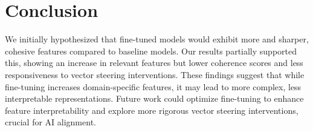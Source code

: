 \section{Conclusion}


We initially hypothesized that fine-tuned models would exhibit more and sharper, cohesive features compared to baseline models. Our results partially supported this, showing an increase in relevant features but lower coherence scores and less responsiveness to vector steering interventions. These findings suggest that while fine-tuning increases domain-specific features, it may lead to more complex, less interpretable representations. Future work could optimize fine-tuning to enhance feature interpretability and explore more rigorous vector steering interventions, crucial for AI alignment.




